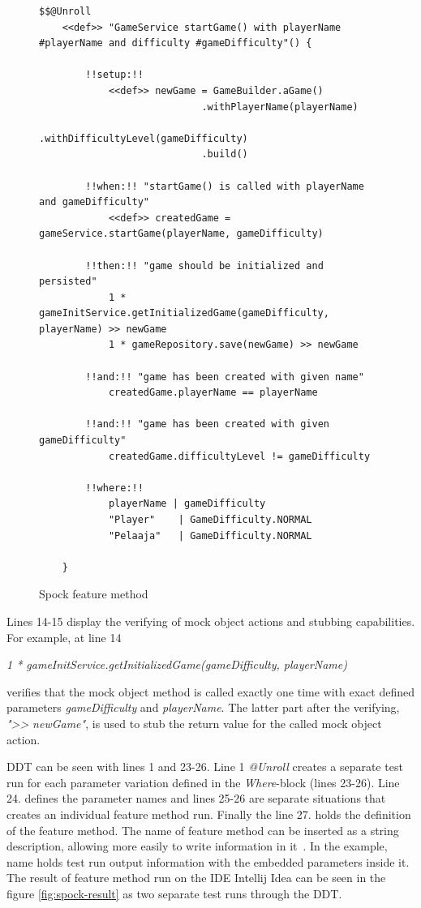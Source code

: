     \clearpage
    \begin{figure}[H]
        \begin{lstlisting}[style=java]
    $$@Unroll
    <<def>> "GameService startGame() with playerName #playerName and difficulty #gameDifficulty"() {

        !!setup:!!
            <<def>> newGame = GameBuilder.aGame()
                            .withPlayerName(playerName)
                            .withDifficultyLevel(gameDifficulty)
                            .build()

        !!when:!! "startGame() is called with playerName and gameDifficulty"
            <<def>> createdGame = gameService.startGame(playerName, gameDifficulty)

        !!then:!! "game should be initialized and persisted"
            1 * gameInitService.getInitializedGame(gameDifficulty, playerName) >> newGame
            1 * gameRepository.save(newGame) >> newGame

        !!and:!! "game has been created with given name"
            createdGame.playerName == playerName

        !!and:!! "game has been created with given gameDifficulty"
            createdGame.difficultyLevel != gameDifficulty

        !!where:!!
            playerName | gameDifficulty
            "Player"    | GameDifficulty.NORMAL
            "Pelaaja"   | GameDifficulty.NORMAL

    }
          \end{lstlisting}
        \caption{Spock feature method}
        \label{fig:spock-example}

    \end{figure}
    Lines 14-15 display the verifying of mock object actions and stubbing capabilities.
    For example, at line 14
    \begin{center}
    \textit{1 * gameInitService.getInitializedGame(gameDifficulty, playerName)}
    \end{center}
    verifies that the mock object method is called exactly one time with exact defined parameters \textit{gameDifficulty} and \textit{playerName}.
    The latter part after the verifying, \textit{"\textgreater\textgreater} \textit{newGame"}, is used to stub the return value for the
    called mock object action.

    DDT can be seen with lines 1 and 23-26.
    Line 1 \textit{@Unroll} creates a separate test run for each parameter
    variation defined in the \textit{Where}-block (lines 23-26). Line 24. defines the parameter names and lines 25-26 are
    separate situations that creates an individual feature method run. Finally the line 27. holds the definition of
    the feature method. The name of feature method can be inserted as a string description, allowing more easily to write
    information in it~\cite{kapelonis2016java}. In the example, name holds test run output information with the embedded parameters inside it.
    The result of feature method run on the IDE Intellij Idea can be seen in the figure \ref{fig:spock-result} as two separate test runs through the DDT.

